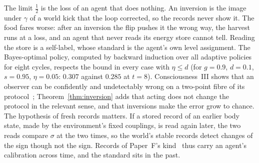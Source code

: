 \documentclass[12pt]{article}
\theoremstyle{definition}
\begin{document}
The limit $\tfrac12$ is the loss of an agent that does nothing. An inversion is the image under $\gamma$ of a world kick that the loop corrected, so the records never show it. The food fares worse: after an inversion the flip pushes it the wrong way, the harvest runs at a loss, and an agent that never reads its energy store cannot tell. Reading the store is a self-label, whose standard is the agent's own level assignment. The Bayes-optimal policy, computed by backward induction over all adaptive policies for eight cycles, respects the bound in every case with $\eta\le d$ (for $g=0.9$, $d=0.1$, $s=0.95$, $\eta=0.05$: $0.307$ against $0.285$ at $t=8$). Consciousness~III shows that an observer can be confidently and undetectably wrong on a two-point fibre of its protocol~\cite{Liu2026CIII}; Theorem~\ref{thm:inversion} adds that acting does not change the protocol in the relevant sense, and that inversions make the error grow to chance. The hypothesis of fresh records matters. If a stored record of an earlier body state, made by the environment's fixed couplings, is read again later, the two reads compare $\sigma$ at the two times, so the world's stable records detect changes of the sign though not the sign. Records of Paper~F's kind~\cite{Liu2026HAFF_F} thus carry an agent's calibration across time, and the standard sits in the past.
\end{document}
